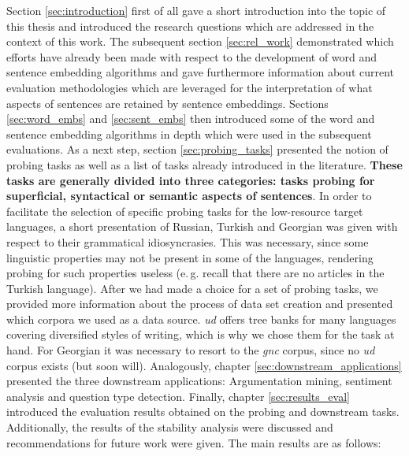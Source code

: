  Section \vref{sec:introduction} first of all gave a short introduction into the topic of this thesis and introduced the research questions which are addressed in the context of this work. The subsequent section \vref{sec:rel_work} demonstrated which efforts have already been made with respect to the development of word and sentence embedding algorithms and gave furthermore information about current evaluation methodologies which are leveraged for the interpretation of what aspects of sentences are retained by sentence embeddings. Sections \vref{sec:word_embs} and \vref{sec:sent_embs} then introduced some of the word and sentence embedding algorithms in depth which were used in the subsequent evaluations. As a next step, section \vref{sec:probing_tasks} presented the notion of probing tasks as well as a list of tasks already introduced in the literature. \textbf{These tasks are generally divided into three categories: tasks probing for superficial, syntactical or semantic aspects of sentences}. In order to facilitate the selection of specific probing tasks for the low-resource target languages, a short presentation of Russian, Turkish and Georgian was given with respect to their grammatical idiosyncrasies. This was necessary, since some linguistic properties may not be present in some of the languages, rendering probing for such properties useless (e.\,g. recall that there are no articles in the Turkish language). After we had made a choice for a set of probing tasks, we provided more information about the process of data set creation and presented which corpora we used as a data source. \textit{\gls{ud}} offers tree banks for many languages covering diversified styles of writing, which is why we chose them for the task at hand. For Georgian it was necessary to resort to the \textit{\gls{gnc}} corpus, since no \textit{\gls{ud}} corpus exists (but soon will). Analogously, chapter \vref{sec:downstream_applications} presented the three downstream applications: Argumentation mining, sentiment analysis and question type detection. Finally, chapter \vref{sec:results_eval} introduced the evaluation results obtained on the probing and downstream tasks. Additionally, the results of the stability analysis were discussed and recommendations for future work were given. The main results are as follows:

